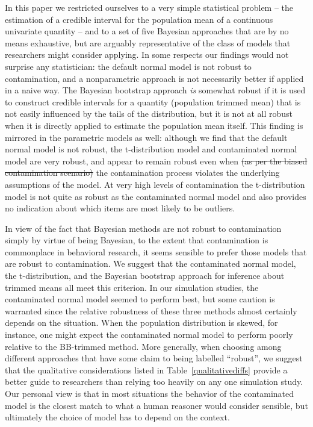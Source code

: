 \documentclass[doc]{apa6}
\begin{document}
{In this paper we restricted ourselves to a very simple statistical problem -- the estimation of a credible interval for the population mean of a continuous univariate quantity -- and to a set of     five   Bayesian approaches that are by no means exhaustive, but are arguably representative of the class of models that researchers might consider applying. In some respects our findings would not surprise any statistician: the default normal model is not robust to contamination, and a nonparametric approach is not necessarily better if applied in a naive way. The Bayesian bootstrap approach {\it is} somewhat robust if it is used to construct credible intervals for a quantity (population trimmed mean) that is not easily influenced by the tails of the distribution, but it is not at all robust when it is directly applied to estimate the population mean itself. This finding is mirrored in the parametric models as well: although we find that the default normal model is not robust, the   t-distribution model and   contaminated normal model     are   very robust, and appear to remain robust even when   \sout{(as per the biased contamination scenario)}   the contamination process violates the underlying assumptions of the model.  At very high levels of contamination the t-distribution model is not quite as robust as the contaminated normal model and also provides no indication about which items are most likely to be outliers.

In view of the fact that Bayesian methods are not robust to contamination simply by virtue of being Bayesian, to the extent that contamination is commonplace in behavioral research, it seems sensible to prefer those models that are robust to contamination. We suggest that the contaminated normal model,   the t-distribution,   and the Bayesian bootstrap approach for inference about trimmed means all meet this criterion. In our simulation studies, the contaminated normal model seemed to perform     best,   but some caution is warranted since the relative robustness of these     three   methods almost certainly depends on the situation. When the population distribution is skewed, for instance, one might expect the contaminated normal model to perform poorly relative to the BB-trimmed method.  More generally, when choosing among different approaches that have some claim to being labelled ``robust'', we suggest that the qualitative considerations listed in Table~\ref{qualitativediffs} provide a better guide to researchers than relying too heavily on any one simulation study. Our personal view is that in most situations the behavior of the contaminated model is the closest match to what a human reasoner would consider sensible, but ultimately the choice of model has to depend on the context.

}
\end{document}
